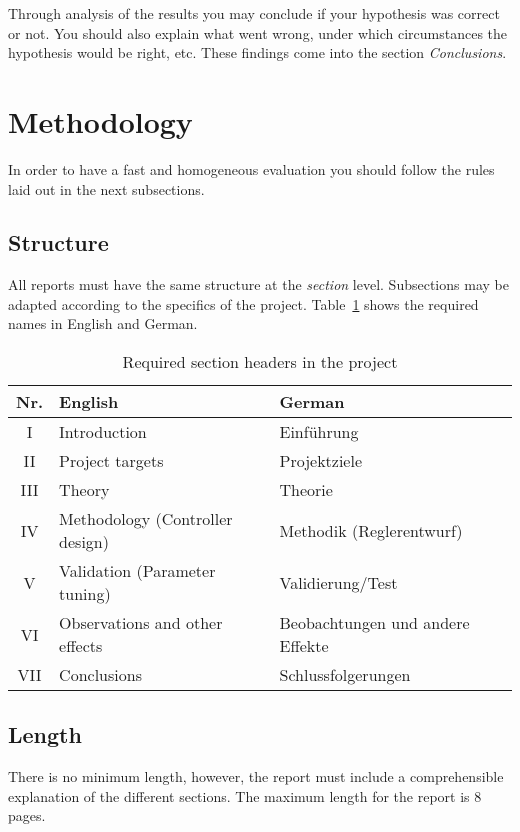 	Through analysis of the results you may conclude if your hypothesis was correct or not. You should also explain what went wrong, under which circumstances the hypothesis would be right, etc. These findings come into the section \emph{Conclusions}.
	
	\section{Methodology} 
	
	In order to have a fast and homogeneous evaluation you should follow the rules laid out in the next subsections.
	
	\subsection{Structure}
	
	All reports must have the same structure at the \emph{section} level. Subsections may be adapted according to the specifics of the project. Table~\ref{tbl:sections} shows the required names in English and German.
	
	\begin{table}[hb]
		\caption{Required section headers in the project}\label{tbl:sections}
		\centering
		\begin{tabular}{cp{12em}p{12em}}
			\hline
			\bfseries Nr. & \bfseries English & \bfseries German\\
			\hline
			I & Introduction & Einführung\\
			II & Project targets & Projektziele \\
			III & Theory & Theorie \\
			IV & Methodology (Controller design) & Methodik (Reglerentwurf)\\
			V & Validation (Parameter tuning) & Validierung/Test \\
			VI & Observations and other effects & Beobachtungen und andere Effekte\\
			VII & Conclusions & Schlussfolgerungen\\
			\hline
		\end{tabular}
	\end{table}
	

	\subsection{Length}
	
	There is no minimum length, however, the report must include a comprehensible explanation of the different sections. The maximum length for the report is 8 pages.
	
